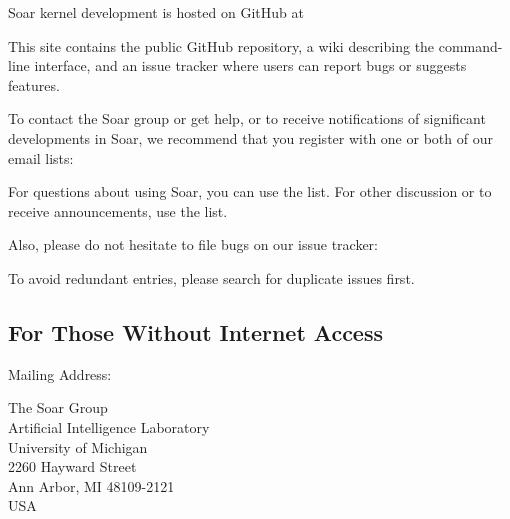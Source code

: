 Soar kernel development is hosted on GitHub at

\hspace{2em}

This site contains the public GitHub repository, a wiki describing the command-line interface,
and an issue tracker where users can report bugs or suggests features.

To contact the Soar group or get help, or to receive notifications of significant developments in Soar,
we recommend that you register with one or both of our email lists:

For questions about using Soar, you can use the  list.
For other discussion or to receive announcements, use the  list.

Also, please do not hesitate to file bugs on our issue tracker:

\hspace{2em}

To avoid redundant entries, please search for duplicate issues first.
\newpage
\subsection*{For Those Without Internet Access}

Mailing Address:

\begin{flushleft}
\hspace{2em}The Soar Group \\
\hspace{2em}Artificial Intelligence Laboratory \\
\hspace{2em}University of Michigan\\
\hspace{2em}2260 Hayward Street\\
\hspace{2em}Ann Arbor, MI 48109-2121 \\
\hspace{2em}USA \\
\end{flushleft}

